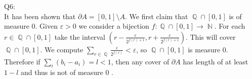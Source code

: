\documentclass[letterpaper]{article}
\DeclareMathOperator{\N}{\mathbb{N}}
\DeclareMathOperator{\Q}{\mathbb{Q}}
\begin{document}
Q6: \\
It has been shown that $\partial A = [0,1]\setminus A$. We first claim that $\Q \cap [0,1]$ is of measure 0. Given $\varepsilon > 0$ we consider a bijection $f:\Q\cap [0,1] \rightarrow \N$. 
For each $r \in \Q\cap [0,1]$ take the interval $(r-\frac{\varepsilon}{2^{f(r)+1}}, r+ \frac{\varepsilon}{2^{f(r)+1}})$. This will cover $\Q\cap [0,1]$. We compute $\sum_{r\in \Q} \frac{\varepsilon}{2^{f(r)}} < \varepsilon$, so $\Q\cap [0,1] $ is measure 0. Therefore if $\sum_i (b_i-a_i) = l < 1$, then any cover of $\partial A$ has length of at least $1-l$ and thus is not of measure 0 . 
\end{document}
